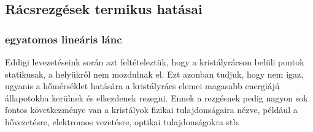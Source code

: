 \documentclass[../main.tex]{subfiles}
\begin{document}
\subsection{Rácsrezgések termikus hatásai}
\subsubsection{egyatomos lineáris lánc}
Eddigi levezetéseink során azt feltételeztük, hogy a kristályrácson belüli pontok statikusak, a helyükről nem mozdulnak el. Ezt azonban tudjuk, hogy nem igaz, ugyanis a hőmérséklet hatására a kristályrács
elemei magasabb energiájú állapotokba kerülnek és elkezdenek rezegni. Ennek a rezgésnek pedig nagyon sok fontos következménye van a kristályok fizikai tulajdonságaira nézve, például a hővezetésre, elektromos vezetésre, optikai tulajdonságokra stb.
\end{document}
